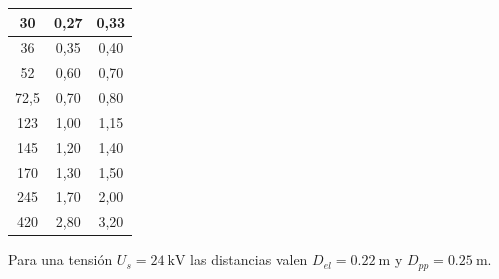 \begin{table}[H]
\begin{tabular}{|c|c|c|}
30                                                                                           & 0,27                                                        & 0,33                                                        \\ \hline
36                                                                                           & 0,35                                                        & 0,40                                                        \\ \hline
52                                                                                           & 0,60                                                        & 0,70                                                        \\ \hline
72,5                                                                                         & 0,70                                                        & 0,80                                                        \\ \hline
123                                                                                          & 1,00                                                        & 1,15                                                        \\ \hline
145                                                                                          & 1,20                                                        & 1,40                                                        \\ \hline
170                                                                                          & 1,30                                                        & 1,50                                                        \\ \hline
245                                                                                          & 1,70                                                        & 2,00                                                        \\ \hline
420                                                                                          & 2,80                                                        & 3,20                                                        \\ \hline
\end{tabular}
\end{table}

Para una tensión $U_s = \SI{24}{\kilo\volt}$ las distancias valen $D_{el}=\SI{0.22}{\meter}$ y $D_{pp}=\SI{0.25}{\meter}$.

